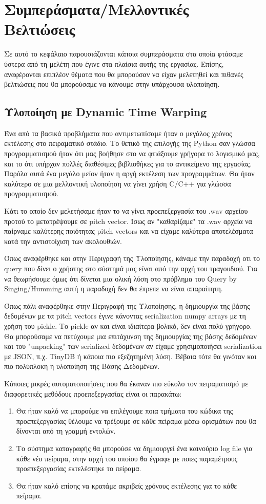 \section{Συμπεράσματα/Μελλοντικές Βελτιώσεις}
Σε αυτό το κεφάλαιο παρουσιάζονται κάποια συμπεράσματα στα οποία φτάσαμε ύστερα από τη μελέτη που έγινε στα πλαίσια αυτής της εργασίας. Επίσης, αναφέρονται επιπλέον θέματα που θα μπορούσαν να είχαν μελετηθεί 
και πιθανές βελτιώσεις που θα μπορούσαμε να κάνουμε στην υπάρχουσα υλοποίηση.

\subsection{Υλοποίηση με Dynamic Time Warping}
Ένα από τα βασικά προβλήματα που αντιμετωπίσαμε ήταν ο μεγάλος χρόνος εκτέλεσης στο πειραματικό στάδιο. Το θετικό της επιλογής της Python σαν γλώσσα προγραμματισμού ήταν ότι μας βοήθησε στο να φτιάξουμε γρήγορα το λογισμικό μας, και το ότι υπήρχαν πολλές διαθέσιμες βιβλιοθήκες για το αντικείμενο της εργασίας. Παρόλα αυτά ένα μεγάλο μείον ήταν η αργή εκτέλεση των προγραμμάτων. Θα ήταν καλύτερο σε μια μελλοντική υλοποίηση να γίνει χρήση C/C++ για γλώσσα προγραμματισμού.
  
Κάτι το οποίο δεν μελετήσαμε ήταν το να γίνει προεπεξεργασία του .wav αρχείου προτού το μετατρέψουμε σε pitch vector. Ίσως αν "καθαρίζαμε" τα .wav αρχεία να παίρναμε καλύτερης ποιότητας pitch vectors και να είχαμε καλύτερα αποτελέσματα κατά την αντιστοίχιση των ακολουθιών. 

Όπως αναφέρθηκε και στην Περιγραφή της Υλοποίησης, κάναμε την παραδοχή οτι το query που δίνει ο χρήστης στο σύστημά μας είναι από την αρχή του τραγουδιού. Για να θεωρήσουμε όμως ότι δίνεται μια ολική λύση στο πρόβλημα του Query by Singing/Humming αυτή η παραδοχή δεν θα έπρεπε να είναι απαραίτητη.

Όπως πάλι αναφέρθηκε στην Περιγραφή της Υλοποίησης, η δημιουργία της βάσης δεδομένων με τα pitch vectors έγινε κάνοντας serialization numpy arrays με τη χρήση του pickle. Το pickle αν και είναι ιδιαίτερα βολικό, δεν είναι πολύ γρήγορο. Θα μπορούσαμε να πετύχουμε μια επιτάχυνση της δημιουργίας της βάσης δεδομένων και του "unpacking" των serialized δεδομένων αν είχαμε χρησιμοποιήσει serialization με JSON, π.χ. TinyDB \cite{tinydb} ή κάποια πιο εξεζητημένη λύση. Βέβαια τότε θα γινόταν και πιο πολύπλοκη η υλοποίηση της Βάσης Δεδομένων.

Κάποιες μικρές αυτοματοποιήσεις που θα έκαναν πιο εύκολο τον πειραματισμό με διαφορετικές μεθόδους προεπεξεργασίας είναι οι παρακάτω:
\begin{enumerate}
	\item Θα ήταν καλό να μπορούμε να επιλέγουμε ποια τμήματα του κώδικα της προεπεξεργασίας θέλουμε να τρέξουμε σε κάθε πείραμα μέσω ορισμάτων που θα δίνονται από τη γραμμή εντολών.
 	\item Το σύστημα καταγραφής θα μπορούσε να δημιουργεί ένα καινούριο log file για κάθε νέο πείραμα, στην αρχή του οποίου θα έγραφε με ποιες παραμέτρους προεπεξεργασίας εκτελέστηκε το πείραμα.
  \item Θα ήταν καλό επίσης να κρατάμε ακριβείς χρόνους εκτέλεσης για το κάθε πείραμα.
\end{enumerate}

